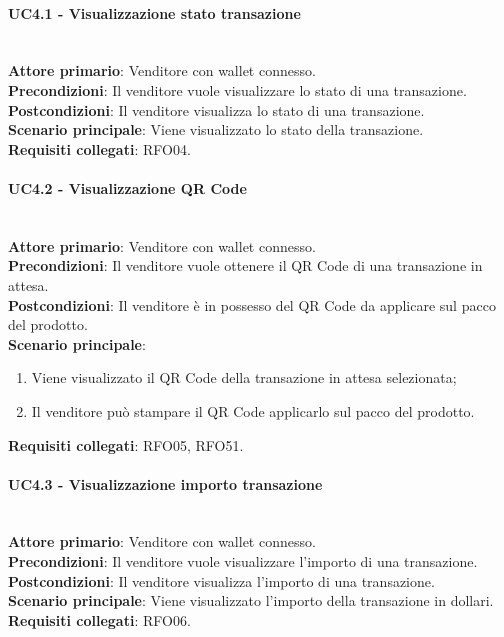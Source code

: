 \documentclass[a4paper, 12pt]{article}
\begin{document}
\paragraph{UC4.1 - Visualizzazione stato transazione}\\
\textbf{Attore primario}: Venditore con wallet connesso.\\
\textbf{Precondizioni}: Il venditore vuole visualizzare lo stato di una transazione.\\
\textbf{Postcondizioni}: Il venditore visualizza lo stato di una transazione.\\
\textbf{Scenario principale}: Viene visualizzato lo stato della transazione.\\
\textbf{Requisiti collegati}: RFO04.

\paragraph{UC4.2 - Visualizzazione QR Code}\\
\textbf{Attore primario}: Venditore con wallet connesso.\\
\textbf{Precondizioni}: Il venditore vuole ottenere il QR Code di una transazione in attesa.\\
\textbf{Postcondizioni}: Il venditore è in possesso del QR Code da applicare sul pacco del prodotto.\\
\textbf{Scenario principale}:
\begin{enumerate}
\item Viene visualizzato il QR Code della transazione in attesa selezionata;
\item Il venditore può stampare il QR Code applicarlo sul pacco del prodotto.
\end{enumerate}
\textbf{Requisiti collegati}: RFO05, RFO51.

\paragraph{UC4.3 - Visualizzazione importo transazione}\\
\textbf{Attore primario}: Venditore con wallet connesso.\\
\textbf{Precondizioni}: Il venditore vuole visualizzare l'importo di una transazione.\\
\textbf{Postcondizioni}: Il venditore visualizza l'importo di una transazione.\\
\textbf{Scenario principale}: Viene visualizzato l'importo della transazione in dollari.\\
\textbf{Requisiti collegati}: RFO06.
\end{document}
